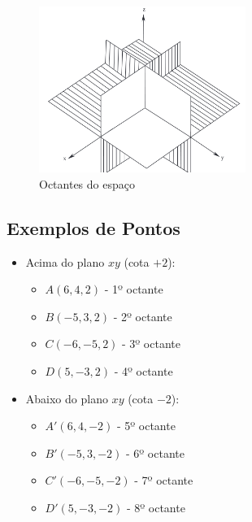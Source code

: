\begin{figure}[H]
  \centering
  \includegraphics[width=0.6\textwidth]{./fig/fig1.59.png}
  \caption{Octantes do espaço}
  \label{fig:fig1.59}
\end{figure}

\subsection{Exemplos de Pontos}

\begin{itemize}
  \item Acima do plano $xy$ (cota $+2$):
    \begin{itemize}
      \item $A(6,4,2)$ - 1º octante
      \item $B(-5,3,2)$ - 2º octante
      \item $C(-6,-5,2)$ - 3º octante
      \item $D(5,-3,2)$ - 4º octante
    \end{itemize}

  \item Abaixo do plano $xy$ (cota $-2$):
    \begin{itemize}
      \item $A'(6,4,-2)$ - 5º octante
      \item $B'(-5,3,-2)$ - 6º octante
      \item $C'(-6,-5,-2)$ - 7º octante
      \item $D'(5,-3,-2)$ - 8º octante
    \end{itemize}
\end{itemize}

